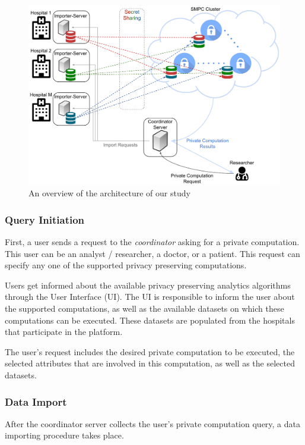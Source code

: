 \begin{figure}[t]
  \centering
  \includegraphics[width=\linewidth]{figures/overview.pdf}
  \caption{An overview of the architecture of our study}\label{f:overview}
\end{figure}

\subsubsection{Query Initiation}\label{sss:query-initiation}
First, a user sends a request to the \textit{coordinator} asking for a private computation.
This user can be an analyst / researcher, a doctor, or a patient.
This request can specify any one of the supported privacy preserving computations.

Users get informed about the available privacy preserving analytics algorithms through the User Interface (UI).
The UI is responsible to inform the user about the supported computations, as well as the available datasets on which these computations can be executed.
These datasets are populated from the hospitals that participate in the platform.

The user's request includes the desired private computation to be executed, the selected attributes that are involved in this computation, as well as the selected datasets.


\subsubsection{Data Import}\label{sss:data-import}
After the coordinator server collects the user's private computation query, a data importing procedure takes place.

